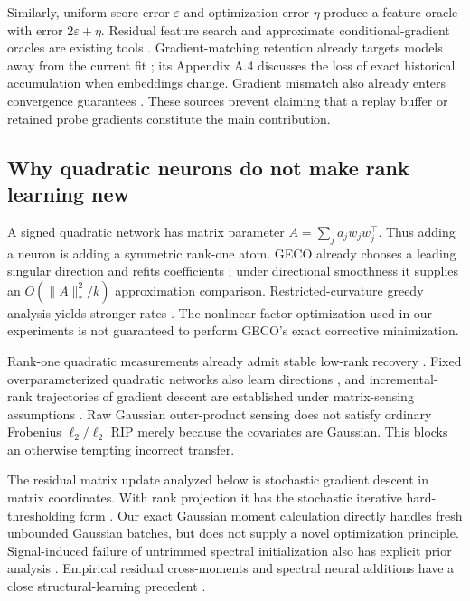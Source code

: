 \documentclass[11pt]{article}
\theoremstyle{remark}\newtheorem{remark}[theorem]{Remark}
\begin{document}
Similarly, uniform score error $\varepsilon$ and optimization error $\eta$
produce a feature oracle with error $2\varepsilon+\eta$. Residual feature
search and approximate conditional-gradient oracles are existing tools
\cite[Section 2.5]{bach}. Gradient-matching retention already targets models
away from the current fit \cite{gmc}; its Appendix A.4 discusses the loss of
exact historical accumulation when embeddings change. Gradient mismatch
also already enters convergence guarantees \cite{gradmatch}. These sources
prevent claiming that a replay buffer or retained probe gradients constitute
the main contribution.

\subsection{Why quadratic neurons do not make rank learning new}
A signed quadratic network has matrix parameter
$A=\sum_j a_jw_jw_j^\top$. Thus adding a neuron is adding a symmetric rank-one
atom. GECO already chooses a leading singular direction and refits
coefficients \cite{geco}; under directional smoothness it supplies an
$O(\|A\|_*^2/k)$ approximation comparison. Restricted-curvature greedy
analysis yields stronger rates \cite[Theorem 4]{khanna}. The nonlinear
factor optimization used in our experiments is not guaranteed to perform
GECO's exact corrective minimization.

Rank-one quadratic measurements already admit stable low-rank recovery
\cite[Theorem 1]{chenchi}. Fixed overparameterized quadratic networks also
learn directions \cite[Theorem 1.2]{lima}, and incremental-rank trajectories
of gradient descent are established under matrix-sensing assumptions
\cite[Theorem 4.1]{jin}. Raw Gaussian outer-product sensing does not satisfy
ordinary Frobenius $\ell_2/\ell_2$ RIP merely because the covariates are
Gaussian. This blocks an otherwise tempting incorrect transfer.

The residual matrix update analyzed below is stochastic gradient descent in
matrix coordinates. With rank projection it has the stochastic iterative
hard-thresholding form \cite[Algorithm 1, Theorem 1]{stoiht}. Our exact
Gaussian moment calculation directly handles fresh unbounded Gaussian
batches, but does not supply a novel optimization principle. Signal-induced
failure of untrimmed spectral initialization also has explicit prior
analysis \cite[Section 2.2]{twf}. Empirical residual cross-moments and
spectral neural additions have a close structural-learning precedent
\cite[Propositions 3.2--3.3]{tiny}.
\end{document}
